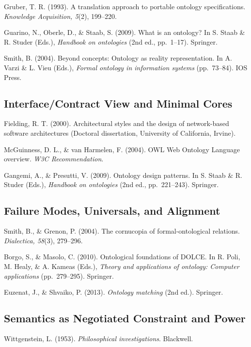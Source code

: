 \documentclass[
  openright]{book}
\begin{document}
Gruber, T. R. (1993). A translation approach to portable ontology
specifications. \emph{Knowledge Acquisition, 5}(2), 199--220.

Guarino, N., Oberle, D., \& Staab, S. (2009). What is an ontology? In S.
Staab \& R. Studer (Eds.), \emph{Handbook on ontologies} (2nd ed.,
pp.~1--17). Springer.

Smith, B. (2004). Beyond concepts: Ontology as reality representation.
In A. Varzi \& L. Vieu (Eds.), \emph{Formal ontology in information
systems} (pp.~73--84). IOS Press.

\subsection{Interface/Contract View and Minimal
Cores}\label{interfacecontract-view-and-minimal-cores}

Fielding, R. T. (2000). Architectural styles and the design of
network-based software architectures (Doctoral dissertation, University
of California, Irvine).

McGuinness, D. L., \& van Harmelen, F. (2004). OWL Web Ontology Language
overview. \emph{W3C Recommendation}.

Gangemi, A., \& Presutti, V. (2009). Ontology design patterns. In S.
Staab \& R. Studer (Eds.), \emph{Handbook on ontologies} (2nd ed.,
pp.~221--243). Springer.

\subsection{Failure Modes, Universals, and
Alignment}\label{failure-modes-universals-and-alignment-1}

Smith, B., \& Grenon, P. (2004). The cornucopia of formal-ontological
relations. \emph{Dialectica, 58}(3), 279--296.

Borgo, S., \& Masolo, C. (2010). Ontological foundations of DOLCE. In R.
Poli, M. Healy, \& A. Kameas (Eds.), \emph{Theory and applications of
ontology: Computer applications} (pp.~279--295). Springer.

Euzenat, J., \& Shvaiko, P. (2013). \emph{Ontology matching} (2nd ed.).
Springer.

\subsection{Semantics as Negotiated Constraint and
Power}\label{semantics-as-negotiated-constraint-and-power-1}

Wittgenstein, L. (1953). \emph{Philosophical investigations}. Blackwell.
\end{document}
